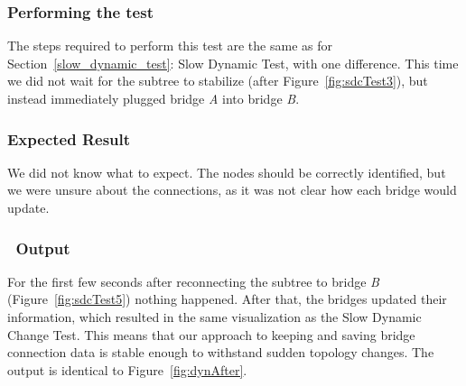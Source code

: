 \subsubsection*{Performing the test}
The steps required to perform this test are the same as for Section~\ref{slow_dynamic_test}: Slow Dynamic Test, with one difference.
This time we did not wait for the subtree to stabilize (after Figure~\ref{fig:sdcTest3}), but instead immediately plugged bridge \textit{A} into bridge \textit{B}.

\subsubsection*{Expected Result}
We did not know what to expect.
The nodes should be correctly identified, but we were unsure about the connections, as it was not clear how each bridge would update.

\subsubsection*{\tool\ Output}
For the first few seconds after reconnecting the subtree to bridge \textit{B} (Figure~\ref{fig:sdcTest5}) nothing happened.
After that, the bridges updated their information, which resulted in the same visualization as the Slow Dynamic Change Test.
This means that our approach to keeping and saving bridge connection data is stable enough to withstand sudden topology changes.
The output is identical to Figure~\ref{fig:dynAfter}.
